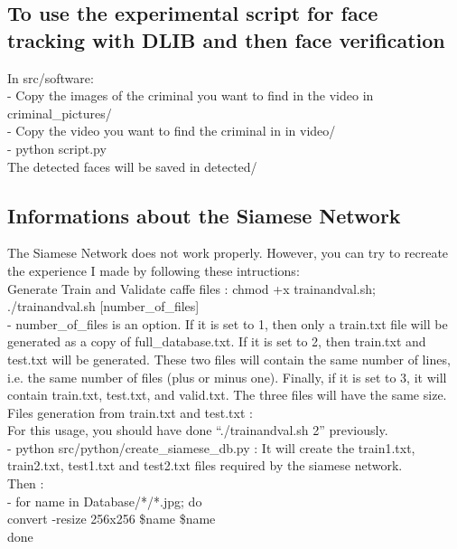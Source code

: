 \subsection{To use the experimental script for face tracking with DLIB and then face verification}

In src/software:\\
- Copy the images of the criminal you want to find in the video in criminal\_pictures/\\
- Copy the video you want to find the criminal in in video/\\
- python script.py\\

The detected faces will be saved in detected/


\subsection{Informations about the Siamese Network}

The Siamese Network does not work properly. However, you can try to recreate the experience I made by following these intructions:\\

Generate Train and Validate caffe files : chmod +x trainandval.sh;  ./trainandval.sh [number\_of\_files]\\

- number\_of\_files is an option. If it is set to 1, then only a train.txt file will be generated as a copy of full\_database.txt. If it is set to 2, then train.txt and test.txt will be generated. These two files will contain the same number of lines, i.e. the same number of files (plus or minus one). Finally, if it is set to 3, it will contain train.txt, test.txt, and valid.txt. The three files will have the same size.\\

Files generation from train.txt and test.txt :\\
For this usage, you should have done \enquote{./trainandval.sh 2} previously.\\
- python src/python/create\_siamese\_db.py : It will create the train1.txt, train2.txt, test1.txt and test2.txt files required by the siamese network.\\

Then :\\
- for name in Database/*/*.jpg; do\\
convert -resize 256x256\! \$name \$name\\
done\\

